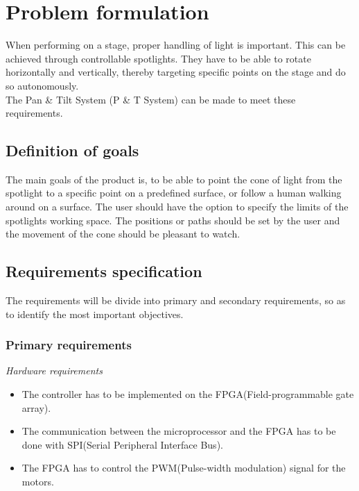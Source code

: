 \newpage

\section{Problem formulation}

When performing on a stage, proper handling of light is important. This can be achieved through controllable spotlights. They have to be able to rotate horizontally and vertically, thereby targeting specific points on the stage and do so autonomously.\\
The Pan \& Tilt System (P \& T System) can be made to meet these requirements.


\subsection{Definition of goals}
The main goals of the product is, to be able to point the cone of light from the spotlight to a specific point on a predefined surface, or follow a human walking around on a surface. The user should have the option to specify the limits of the spotlights working space. The positions or paths should be set by the user and the movement of the cone should be pleasant to watch.

\subsection{Requirements specification}
\label{sec:RequirementsSpecification}

The requirements will be divide into primary and secondary requirements, so as to identify the most important objectives.


\subsubsection{Primary requirements}

\textit{Hardware requirements}

\begin{itemize}

\item The controller has to be implemented on the FPGA(Field-programmable gate array).

\item The communication between the microprocessor and the FPGA has to be done with SPI(Serial Peripheral Interface Bus).

\item The FPGA has to control the PWM(Pulse-width modulation) signal for the motors.
\end{itemize}


